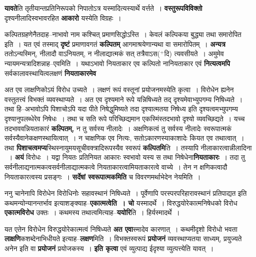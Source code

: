 \documentclass[article,12pt,a4paper]{memoir}
\newcommand{\add}[1]{($^{+}$#1)}
\begin{document}
	  \pstart \textbf{यावते}ति तृतीयान्तप्रतिनिरूपको निपातोऽत्र यस्मादित्यस्यार्थे वर्त्तते । \textbf{वस्तुरूपविविक्तो} दृश्यनीलादिस्वभावरहित \textbf{आकारो} यस्येति विग्रहः ।
	\pend
      

	  \pstart कल्पितग्रहणेनैतदाह--नाभावो नाम कश्चित् प्रमाणसिद्धोऽस्ति । केवलं कल्पिकया बुद्ध्या तथा समारोपित इति । यत एवं तस्माद् \textbf{दृष्टं} प्रमाणावगतं \textbf{कल्पितम्} आगमाश्रयेणान्यथा वा समारोपितम् । \textbf{अन्यत्र} ततोऽन्यस्मिन्, नीलादौ वाऽनियतम्, न नीलाद्यात्मकं सत् तत्रैवाऽस\add{दि} त्यवसीयते । अमुमेव न्यायमन्यत्रादिशन्ना\leavevmode{}ह--एवमिति । यथाऽभावो नियताकार एव कल्पितो नानियताकार एवं \textbf{नित्यत्वमपि} सर्वकालावस्थायित्वलक्षणं \textbf{नियताकारमेव}  \leavevmode{} 
	  
	अत एव लाक्षणिकोऽयं विरोध उच्यते । लक्षणं रूपं वस्तूनां प्रयोजनमस्येति कृत्वा । विरोधेन ह्यनेन वस्तुतत्त्वं विभक्तं व्यवस्थाप्यते । अत एव दृश्यमाने रूपे यन्निषिध्यते तद् दृश्यमेवाभ्युपगम्य निषिध्यते । तथा हि--अभावोऽपि पिशाचोऽपि यदा पीते निषेद्धुमिष्यते तदा दृश्यात्मतया निषेध्य इति दृश्यत्वमभ्युपगम्य दृश्यानुपलब्धेरेव निषेधः । तथा च सति रूपे परिच्छिद्यमान एकस्मिंस्तदभावो दृश्यो व्यवच्छिद्यते । यच्च तदभाववन्नियताकारं \textbf{कल्पितम्,} न तु सर्वस्य नीलादेः । अक्षणिकत्वं तु सर्वस्य नीलादेः स्वरूपात्मकं सर्वस्यैवानेकक्षणस्थायित्वात् । न चाक्षणिक एव नित्यः, सतोऽकारणस्याकाशादेः कियत एव तथात्वात् । तथा \textbf{पिशाचत्वमप्य}स्थिस्नायुमयसूचीवक्त्रादिरूपस्यैव स्वरूपं \textbf{कल्पितमि}ति । तस्यापि नीलाकारत्वान्नीलादिना  । \textbf{अयं} विरोधः । यद्वा नियतः प्रतिनियत आकारः स्वभावो यस्य स तथा निषेधेना\textbf{नियताकारः} । तदा तु सर्वनीलाद्यनात्मकत्वसर्वनीलाद्यात्मकत्वे नियताकारत्वामियताकारत्वे वाच्ये । तेन न क्षणिकत्वादौ नियताकारत्वस्य प्रसङ्गः । \textbf{सर्देषां स्वरूपात्मकमिति} च विवरणमर्थाभेदेन नेयमिति ।
	\pend
      

	  \pstart ननु चानेनापि विरोधेन विरोधिनोः सहावस्थानं निषिध्यते । पूर्वेणापि परस्परपरिहारावस्थानं प्रतिपाद्यत इति कथमन्योन्यानन्तर्भाव इत्याशङ्क्याह--\textbf{एकात्मत्वेति । चो} यस्मादर्थे । विरुद्धयोरेकात्मनिषेधको विरोध \textbf{एकात्मविरोध} उक्तः । कथमस्य तथात्वमित्याह--\textbf{ययोरि}ति । हिर्यस्मादर्थे ।
	\pend
      

	  \pstart यत एतेन विरोधेन विरुद्धयोरेकात्मत्वं निषिध्यते \textbf{अत एवा}स्मादेव कारणात् । कथमीदृशो विरोधो भवता \textbf{लाक्षणि}कशब्देनाभिधीयते इत्याह--\textbf{लक्षण}मिति । विभक्तस्वरूपं \textbf{प्रयोजनं} व्यवस्थाप्यतया साध्यम्, प्रयुज्यते अनेन इति वा \textbf{प्रयोजनं} प्रयोजकस्य । \textbf{इति कृत्वा} एवं व्युत्पाद्य ईदृश्या व्युत्पत्त्येति यावत् ।
	\pend
      
\end{document}
